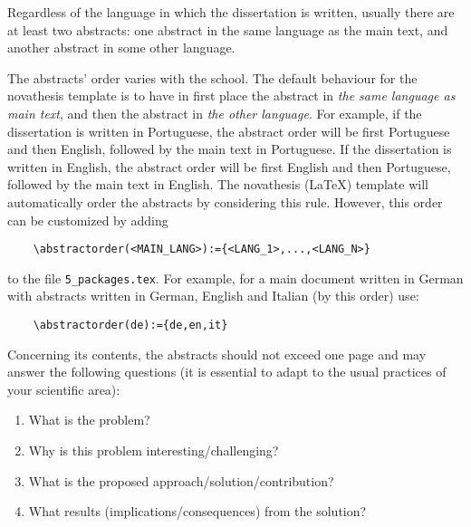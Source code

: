 
%

Regardless of the language in which the dissertation is written, usually there are at least two abstracts: one abstract in the same language as the main text, and another abstract in some other language.

The abstracts' order varies with the school.  The default behaviour for the \gls{novathesis} template is to have in first place the abstract in \emph{the same language as main text}, and then the abstract in \emph{the other language}. For example, if the dissertation is written in Portuguese, the abstract order will be first Portuguese and then English, followed by the main text in Portuguese. If the dissertation is written in English, the abstract order will be first English and then Portuguese, followed by the main text in English.
%
The \gls{novathesis} (\LaTeX) template will automatically order the abstracts by considering this rule. However, this order can be customized by adding
\begin{verbatim}
    \abstractorder(<MAIN_LANG>):={<LANG_1>,...,<LANG_N>}
\end{verbatim}
\noindent to the file \verb!5_packages.tex!.  For example, for a main document written in German with abstracts written in German, English and Italian (by this order) use:
\begin{verbatim}
    \abstractorder(de):={de,en,it}
\end{verbatim}

Concerning its contents, the abstracts should not exceed one page and may answer the following questions (it is essential to adapt to the usual practices of your scientific area):

\begin{enumerate}
  \item What is the problem?
  \item Why is this problem interesting/challenging?
  \item What is the proposed approach/solution/contribution?
  \item What results (implications/consequences) from the solution?
\end{enumerate}

